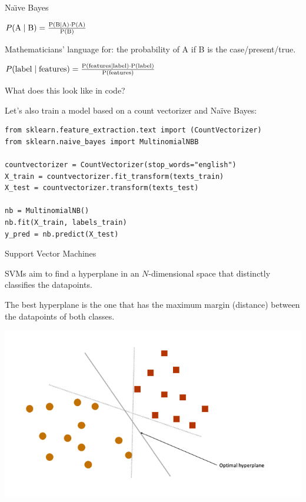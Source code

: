 \documentclass[compress]{beamer}
\begin{document}
\begin{frame}{Na\"{\i}ve Bayes}
	
$ P(\rm{A} \mid \rm{B}) = \frac{P(\rm{B} \mid \rm{A}) \cdot P(\rm{A})}{P(\rm{B})} $
	
Mathematicians’ language for: the probability of A if B is the case/present/true. 
	
$ P(\rm{label} \mid \rm{features}) = \frac{P(\rm{features} \mid \rm{label}) \cdot P(\rm{label})}{P(\rm{features})} $

\end{frame}



\begin{frame}[fragile]{What does this look like in code?}
	
Let's also train a model based on a count vectorizer and Naïve Bayes:
	
\begin{lstlisting}
from sklearn.feature_extraction.text import (CountVectorizer)
from sklearn.naive_bayes import MultinomialNBB
		
countvectorizer = CountVectorizer(stop_words="english")
X_train = countvectorizer.fit_transform(texts_train)
X_test = countvectorizer.transform(texts_test)
		
nb = MultinomialNB()
nb.fit(X_train, labels_train)
y_pred = nb.predict(X_test)
\end{lstlisting}
	
\end{frame}


\begin{frame}{Support Vector Machines}
	
SVMs aim to find a hyperplane in an \(N\)-dimensional space that distinctly classifies the datapoints. 
	
The best hyperplane is the one that has the maximum margin (distance) between the datapoints of both classes.
	
\begin{center}
	\includegraphics[width=\linewidth,height=0.5\textheight,keepaspectratio]{../pictures/optimal_hyperplane.png} \\\
\end{center}
	
\end{frame}
\end{document}
